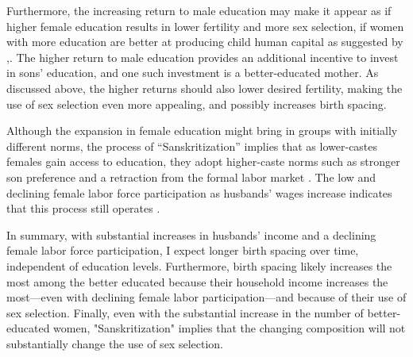 Furthermore, the increasing return to male education may make it appear as if higher 
female education results in lower fertility and more sex selection, if women with more 
education are better at producing child human capital as suggested by \citet{Behrman1999},.
The higher return to male education provides an additional incentive to invest in sons'
education, and one such investment is a better-educated mother.
As discussed above, the higher returns should also lower desired fertility, making the use 
of sex selection even more appealing, and possibly increases birth spacing.


Although the expansion in female education might bring in groups with initially different 
norms, the process of ``Sanskritization'' implies that as lower-castes females gain access 
to education, they adopt higher-caste norms such as stronger son preference and a retraction 
from the formal labor market \citep{Srinivas1956}.
The low and declining female labor force participation as husbands' wages increase 
indicates that this process still operates \citep{Abraham2013,Chatterjee2018}.


In summary, with substantial increases in husbands' income and a declining female labor 
force participation, I expect longer birth spacing over time, independent of education 
levels.
Furthermore, birth spacing likely increases the most among the better educated 
because their household income increases the most---even with declining female labor 
participation---and because of their use of sex selection.
Finally, even with the substantial increase in the number of better-educated women, 
"Sanskritization" implies that the changing composition will not substantially change the 
use of sex selection.






